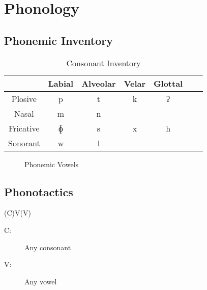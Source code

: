 \chapter{Phonology}

\section{Phonemic Inventory}
\begin{table}[ht]
  \centering
  \begin{tabular}{*{7}{c}}
    \toprule
              & Labial & Alveolar & Velar & Glottal \\\midrule
    Plosive   & p      & t        & k     & ʔ       \\
    Nasal     & m      & n        &       &         \\
    Fricative & ɸ      & s        & x     & h       \\
    Sonorant  & w      & l        &       &         \\
    \bottomrule
  \end{tabular}
  \caption{Consonant Inventory}
  \label{table:consonants}
\end{table}


\begin{figure}[ht]
  \centering
  \begin{vowel}
  \end{vowel}
  \caption{Phonemic Vowels}
  \label{table:vowel_phonemes}
\end{figure}


\section{Phonotactics}\label{sec:phonotactics}

(C)V(V)
\begin{description}
  \item[C:] Any consonant
  \item[V:] Any vowel
\end{description}

